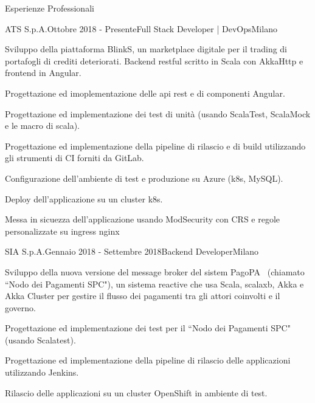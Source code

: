 \documentclass{resume} %
\begin{document}

\begin{rSection}{Esperienze Professionali}

\begin{rSubsection}{ATS S.p.A.}{Ottobre 2018 - Presente}{Full Stack Developer | DevOps}{Milano}
\item Sviluppo della piattaforma BlinkS, un marketplace digitale per il trading di portafogli di crediti deteriorati.
Backend restful scritto in Scala con AkkaHttp e frontend in Angular.
\item Progettazione ed imoplementazione delle api rest e di componenti Angular.
\item Progettazione ed implementazione dei test di unit\`a (usando ScalaTest, ScalaMock e le macro di scala).
\item Progettazione ed implementazione della pipeline di rilascio e di build utilizzando gli strumenti di CI forniti da GitLab.
\item Configurazione dell'ambiente di test e produzione su Azure (k8s, MySQL).
\item Deploy dell'applicazione su un cluster k8s.
\item Messa in sicuezza dell'applicazione usando ModSecurity con CRS e regole personalizzate su ingress nginx
\end{rSubsection}


\begin{rSubsection}{SIA S.p.A.}{Gennaio 2018 - Settembre 2018}{Backend Developer}{Milano}
\item Sviluppo della nuova versione del message broker del sistem PagoPA\textregistered~ (chiamato ``Nodo dei Pagamenti SPC"),
un sistema reactive che usa Scala, scalaxb, Akka e Akka Cluster per gestire il flusso dei pagamenti tra gli attori coinvolti e il governo.
\item Progettazione ed implementazione dei test per il ``Nodo dei Pagamenti SPC" (usando Scalatest).
\item Progettazione ed implementazione della pipeline di rilascio delle applicazioni utilizzando Jenkins.
\item Rilascio delle applicazioni su un cluster OpenShift in ambiente di test.
\end{rSubsection}


\end{rSection}
\end{document}
